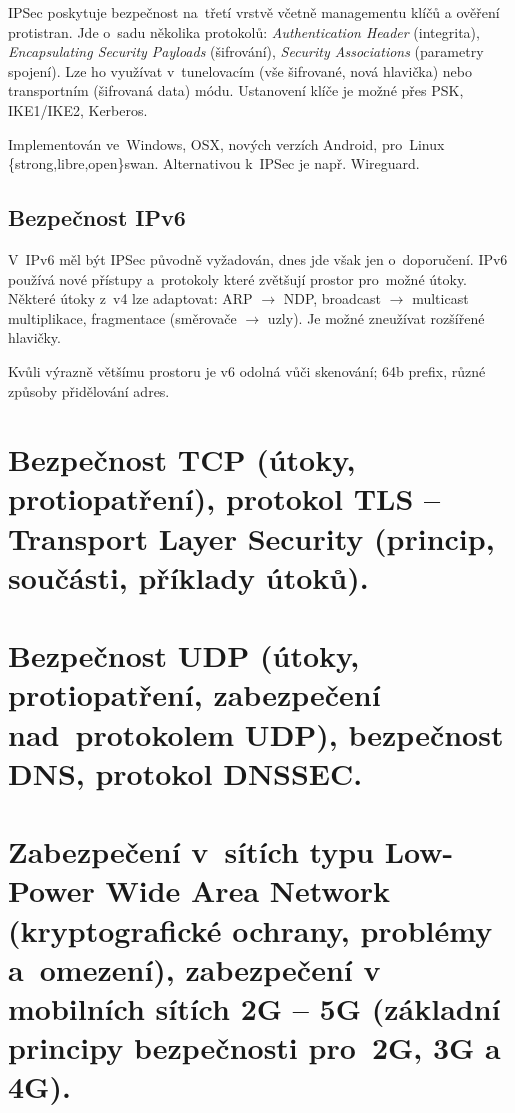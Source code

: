 IPSec poskytuje bezpečnost na~třetí vrstvě včetně managementu klíčů a ověření protistran.
Jde o~sadu několika protokolů: \emph{Authentication Header} (integrita), \emph{Encapsulating Security Payloads} (šifrování), \emph{Security Associations} (parametry spojení).
Lze ho využívat v~tunelovacím (vše šifrované, nová hlavička) nebo transportním (šifrovaná data) módu.
Ustanovení klíče je možné přes PSK, IKE1/IKE2, Kerberos.

Implementován ve~Windows, OSX, nových verzích Android, pro~Linux \{strong,libre,open\}swan.
Alternativou k~IPSec je např. Wireguard.


\subsection{Bezpečnost IPv6}

V~IPv6 měl být IPSec původně vyžadován, dnes jde však jen o~doporučení.
IPv6 používá nové přístupy a~protokoly které zvětšují prostor pro~možné útoky.
Některé útoky z~v4 lze adaptovat: ARP $\rightarrow$ NDP, broadcast $\rightarrow$ multicast multiplikace, fragmentace (směrovače $\rightarrow$ uzly).
Je možné zneužívat rozšířené hlavičky.

Kvůli výrazně většímu prostoru je v6 odolná vůči skenování; 64b prefix, různé způsoby přidělování adres.




\clearpage
\section{Bezpečnost TCP (útoky, protiopatření), protokol TLS -- Transport Layer Security (princip, součásti, příklady útoků).}



\clearpage
\section{Bezpečnost UDP (útoky, protiopatření, zabezpečení nad~protokolem UDP), bezpečnost DNS, protokol DNSSEC.}



\clearpage
\section{Zabezpečení v~sítích typu Low-Power Wide Area Network (kryptografické ochrany, problémy a~omezení), zabezpečení v mobilních sítích 2G -- 5G (základní principy bezpečnosti pro~2G, 3G a 4G).}




